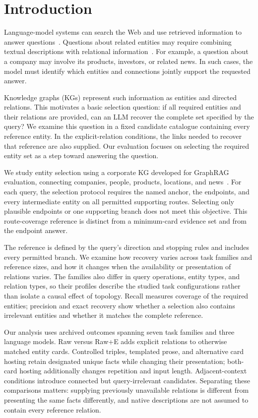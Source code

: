 \section{Introduction}
\label{sec:intro}

Language-model systems can search the Web and use retrieved information to answer questions~\cite{nakano2021webgpt}. Questions about related entities may require combining textual descriptions with relational information~\cite{wu2024stark}. For example, a question about a company may involve its products, investors, or related news. In such cases, the model must identify which entities and connections jointly support the requested answer.

Knowledge graphs (KGs) represent such information as entities and directed relations. This motivates a basic selection question: if all required entities and their relations are provided, can an LLM recover the complete set specified by the query? We examine this question in a fixed candidate catalogue containing every reference entity. In the explicit-relation conditions, the links needed to recover that reference are also supplied. Our evaluation focuses on selecting the required entity set as a step toward answering the question.

We study entity selection using a corporate KG developed for GraphRAG evaluation, connecting companies, people, products, locations, and news~\cite{kirpichev2026towards}. For each query, the selection protocol requires the named anchor, the endpoints, and every intermediate entity on all permitted supporting routes. Selecting only plausible endpoints or one supporting branch does not meet this objective. This route-coverage reference is distinct from a minimum-card evidence set and from the endpoint answer.

The reference is defined by the query's direction and stopping rules and includes every permitted branch. We examine how recovery varies across task families and reference sizes, and how it changes when the availability or presentation of relations varies. The families also differ in query operations, entity types, and relation types, so their profiles describe the studied task configurations rather than isolate a causal effect of topology. Recall measures coverage of the required entities; precision and exact recovery show whether a selection also contains irrelevant entities and whether it matches the complete reference.

Our analysis uses archived outcomes spanning seven task families and three language models. Raw versus Raw+E adds explicit relations to otherwise matched entity cards. Controlled triples, templated prose, and alternative card hosting retain designated unique facts while changing their presentation; both-card hosting additionally changes repetition and input length. Adjacent-context conditions introduce connected but query-irrelevant candidates. Separating these comparisons matters: supplying previously unavailable relations is different from presenting the same facts differently, and native descriptions are not assumed to contain every reference relation.

